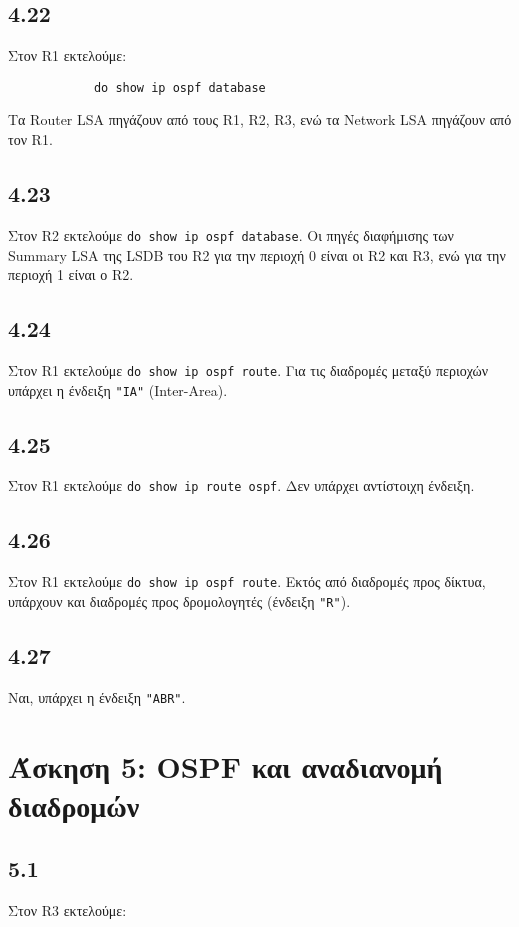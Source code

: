 \documentclass[a4paper, 12pt]{article}
\begin{document}
	\subsection*{4.22}
		Στον R1 εκτελούμε:
		
		\begin{verbatim}
			do show ip ospf database
		\end{verbatim}
		
		Τα Router LSA πηγάζουν από τους R1, R2, R3, ενώ τα Network LSA πηγάζουν από τον R1.

	\subsection*{4.23}
		Στον R2 εκτελούμε \verb|do show ip ospf database|. Οι πηγές διαφήμισης των Summary LSA της LSDB του R2 για την περιοχή 0 είναι οι R2 και R3, ενώ για την περιοχή 1 είναι ο R2.

	\subsection*{4.24}
		Στον R1 εκτελούμε \verb|do show ip ospf route|. Για τις διαδρομές μεταξύ περιοχών υπάρχει η ένδειξη \verb|"IA"| (Inter-Area).

	\subsection*{4.25}
		Στον R1 εκτελούμε \verb|do show ip route ospf|. Δεν υπάρχει αντίστοιχη ένδειξη.
		
	\subsection*{4.26}
		Στον R1 εκτελούμε \verb|do show ip ospf route|. Εκτός από διαδρομές προς δίκτυα, υπάρχουν και διαδρομές προς δρομολογητές (ένδειξη \verb|"R"|).

	\subsection*{4.27}
		Ναι, υπάρχει η ένδειξη \verb|"ABR"|.


\section*{Άσκηση 5: OSPF και αναδιανομή διαδρομών}

	\subsection*{5.1}
		Στον R3 εκτελούμε:
		
\end{document}
